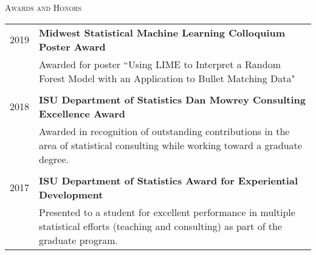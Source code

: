 \documentclass[10pt, oneside]{article}
\begin{document}
\noindent \textsc{Awards and Honors} \hrulefill
\begin{longtable}{p{3.5cm}p{13cm}}
\hfill{2019} & \textbf{Midwest Statistical Machine Learning Colloquium Poster Award}\\
& Awarded for poster ``Using LIME to Interpret a Random Forest Model with an Application to Bullet Matching Data"\\
\\
\hfill{2018} & \textbf{ISU Department of Statistics Dan Mowrey Consulting Excellence Award}\\
& Awarded in recognition of outstanding contributions in the area of statistical consulting while working toward a graduate degree.\\
\\
\hfill{2017} & \textbf{ISU Department of Statistics Award for Experiential Development}\\
& Presented to a student for excellent performance in multiple statistical efforts (teaching and consulting) as part of the graduate program.
\end{longtable}
\end{document}
